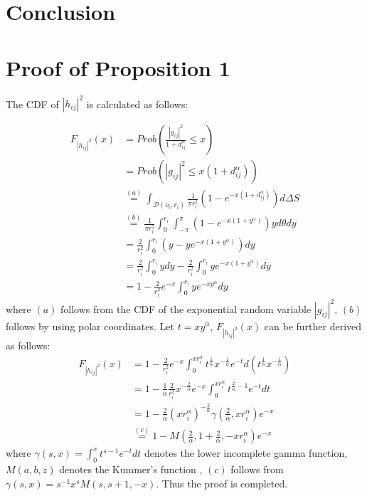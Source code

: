 \documentclass[journal]{IEEEtran}
\begin{document}
\section{Conclusion}

\appendices
\section{Proof of Proposition 1}
The CDF of $\left|h_{ij} \right|^2$ is calculated as follows:

\begin{align}
F_{\left|h_{ij} \right|^2} \left(x\right) &= Prob\left(\frac{\left|g_{ij}\right|^2}{1 + d_{ij}^{\alpha}} \leq x \right) \nonumber \\
& = Prob \left(\left|g_{ij}\right|^2 \leq x \left(1 + d_{ij}^\alpha\right)\right) \nonumber \\
& \overset{\left(a\right)}{=} \int_{\mathcal{D}(o_i, r_i)} \frac{1}{\pi r_i^2}\left(1 - e^{-x\left(1 + d_{ij}^{\alpha}\right)}\right) d\Delta S \nonumber\\
& \overset{\left(b\right)}{=} \frac{1}{\pi r_i^2} \int_{0}^{r_i} \int_{-\pi}^{\pi}\left(1 - e^{-x\left(1 + y^{\alpha}\right)}\right)y d \theta d y \nonumber \\
& = \frac{2}{r_i^2}\int_{0}^{r_i} \left(y - ye^{-x\left(1 + y^\alpha\right)}\right) dy \nonumber \\
& = \frac{2}{r_i^2}\int_{0}^{r_i}y dy - \frac{2}{r_i^2}\int_{0}^{r_i} y e^{-x \left(1 + y^\alpha\right)}dy \nonumber \\
& = 1 - \frac{2}{r_i^2}e^{-x} \int_{0}^{r_i}y e^{-xy^{\alpha}}dy
\end{align}
where $\left(a\right)$ follows from the CDF of the exponential random variable $\left|g_{ij}\right|^2$, $\left(b\right)$ follows by using polar coordinates. Let $t = xy^{\alpha}$, $F_{\left|h_{ij} \right|^2} \left(x\right)$ can be further derived as follows:
\begin{align}
F_{\left|h_{ij} \right|^2} \left(x\right) &= 1 - \frac{2}{r_i^2}e^{-x} \int_{0}^{x r_i^{\alpha}} t^{\frac{1}{\alpha}} x^{-\frac{1}{\alpha}}e^{-t} d\left(t^{\frac{1}{\alpha}} x^{-\frac{1}{\alpha}}\right) \nonumber \\
& = 1 - \frac{1}{\alpha} \frac{2}{r_i^2} x^{-\frac{2}{\alpha}} e^{-x} \int_{0}^{x r_i^{\alpha}} t^{\frac{2}{\alpha} - 1}e^{-t} dt \nonumber \\
& = 1 - \frac{2}{\alpha} \left(x r_i^{\alpha}\right) ^{-\frac{2}{\alpha}} \gamma\left(\frac{2}{\alpha}, xr_i^{\alpha}\right)e^{-x} \nonumber \\
& \overset{\left(c\right)}{=} 1 - M\left(\frac{2}{\alpha}, 1 + \frac{2}{\alpha}, -xr_i^{\alpha}\right)e^{-x}
\end{align}
where $\gamma\left(s,x\right) = \int_{0}^{x}t^{s-1}e^{-t}dt$ denotes the lower incomplete gamma function, $M\left(a,b,z\right)$ denotes the Kummer's function \cite{MAbramowitz}, $\left(c\right)$ follows from $\gamma\left(s,x\right) = s^{-1} x^s M\left(s,s+1,-x\right)$. Thus the proof is completed. 
\end{document}
